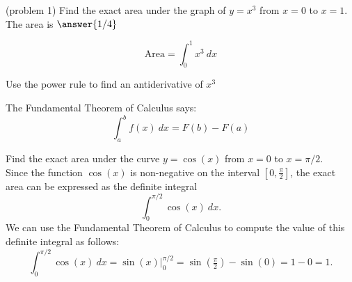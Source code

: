 \documentclass[handout]{ximera}
\begin{document}
\begin{problem}(problem 1)
Find the exact area under the graph of $y = x^3$ from $x = 0$ to $x = 1$.\\
The area is $\answer{1/4}$

\begin{hint}
  \[
  \text{Area} = \int_0^{1} x^3 \ dx 
  \]
\end{hint}
    \begin{hint}
      Use the power rule to find an antiderivative of $x^3$
    \end{hint}
    
    \begin{hint}
      The Fundamental Theorem of Calculus says:
      \[
      \int_a^b f(x) \ dx = F(b) - F(a)
      \]
    \end{hint}    
		
		
\end{problem}



\begin{example}[example 2]
Find the exact area under the curve $y = \cos(x)$ from $x=0$ to $x= \pi/2$.\\
Since the function $\cos(x)$ is non-negative on the interval $[0, \frac{\pi}{2}]$, the exact area can be 
expressed as the definite integral
\[\int_0^{\pi/2} \cos(x) \ dx.\]
We can use the Fundamental Theorem of Calculus to compute the value of this definite integral as follows:
\[\int_0^{\pi/2} \cos(x) \ dx = \sin(x) \Big|_0^{\pi/2} = \sin(\tfrac{\pi}{2}) - \sin(0)= 1- 0 = 1.\]


\begin{image}
\end{image}

\end{example}
\end{document}
